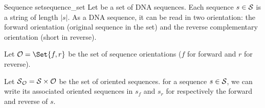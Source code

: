 \begin{definition}{Sequence set}{sequence_set}
  Let \Sequences{} be a set of DNA sequences.
  Each sequence \(s \in \mathcal{S}{}\) is a string of length \(|s|\).
  As a DNA sequence, it can be read in two orientation:
  the forward orientation (original sequence in the set) and the reverse complementary orientation (short in reverse).

  Let \( \Orientations{} = \Set{f, r} \) be the set of sequence orientations (\(f\) for forward and \(r\) for reverse).

  Let \( \mathcal{S}{}_{\mathcal{O}{}}{} = \mathcal{S}{} \times \mathcal{O}{} \) be the set of oriented sequences.
  for a sequence \(s \in \mathcal{S}{}\), we can write its associated oriented sequences in \OrSeqs{} \(s_f\) and \(s_r\) for respectively the forward and reverse of \(s\).
\end{definition}